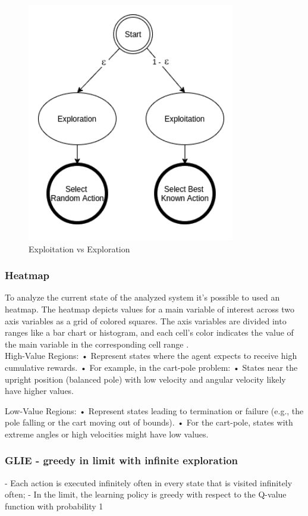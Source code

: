 \documentclass{article}
\begin{document}
\begin{figure}[h]
	\centering
	\includegraphics[width=0.5\linewidth]{../data/images/exp_e.png}
	\caption{Exploitation vs Exploration \cite{q_le}}
	\label{fig:expl}
\end{figure}

\subsubsection{Heatmap}
To analyze the current state of the analyzed system it's possible to used an heatmap. The heatmap depicts values for a main variable of interest across two axis variables as a grid of colored squares. The axis variables are divided into ranges like a bar chart or histogram, and each cell’s color indicates the value of the main variable in the corresponding cell range \cite{heatmap}. \\ 

High-Value Regions:
•	Represent states where the agent expects to receive high cumulative rewards.
•	For example, in the cart-pole problem:
•	States near the upright position (balanced pole) with low velocity and angular velocity likely have higher values.

Low-Value Regions:
•	Represent states leading to termination or failure (e.g., the pole falling or the cart moving out of bounds).
•	For the cart-pole, states with extreme angles or high velocities might have low values.

 

\subsubsection{GLIE - greedy in limit with infinite exploration}
-	Each action is executed infinitely often in every state that is visited infinitely often;
-	In the limit, the learning policy is greedy with respect to the Q-value function with probability 1
\end{document}
